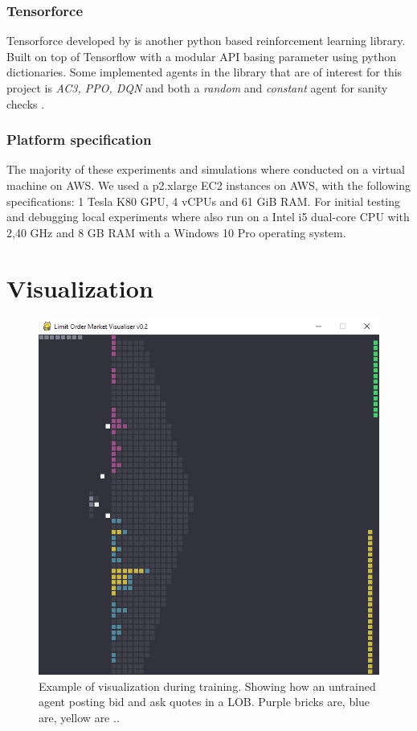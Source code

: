 \documentclass{kththesis}
\theoremstyle{definition}
\begin{document}
\subsubsection*{Tensorforce}
Tensorforce developed by \textcite{schaarschmidt2017tensorforce} is another python based reinforcement learning library. Built on top of Tensorflow with a modular API basing parameter using python dictionaries. Some implemented agents in the library that are of interest for this project is \textit{AC3, PPO, DQN} and both a \textit{random} and \textit{constant} agent for sanity checks \parencite{schaarschmidt2017tensorforce}.

\subsubsection*{Platform specification}
The majority of these experiments and simulations where conducted on a virtual machine on AWS. 
We used a p2.xlarge EC2 instances on AWS, with the following specifications: 1 Tesla K80 GPU, 4 vCPUs and 61 GiB RAM. For initial testing and debugging local experiments where also run on a Intel i5 dual-core CPU with 2,40 GHz and 8 GB RAM with a Windows 10 Pro operating system. 


\section{Visualization}

\begin{figure}[H]
    \centering
    \includegraphics[scale=.4]{Imgs/lob_untrained_Moment.jpg}
    \caption{Example of visualization during training. Showing how an untrained agent posting bid and ask quotes in a LOB. Purple bricks are, blue are, yellow are ..}
    \label{fig:v1}
\end{figure}
\end{document}
